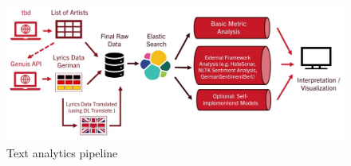 \begin{figure}[!htb]
    \centering
    \includegraphics[width=\textwidth]{figures/pipeline.jpg}
    \caption[]{Text analytics pipeline}
    \label{fig:example}
  \end{figure}
  